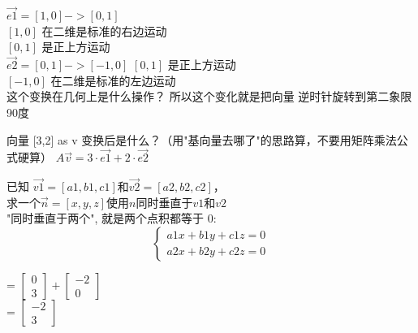 \documentclass[12pt]{article}
\begin{document}
\begin{flushleft}





$\vec{e1} = [1, 0] -> [0, 1]$ \\
$[1,0]$ 在二维是标准的右边运动 \\
$[0,1]$ 是正上方运动 \\

$\vec{e2} = [0, 1] -> [-1, 0] $
$[0,1]$ 是正上方运动 \\
$[-1,0]$ 在二维是标准的左边运动 \\

这个变换在几何上是什么操作？
所以这个变化就是把向量 逆时针旋转到第二象限 90度

向量
[3,2] as v 变换后是什么？（用"基向量去哪了"的思路算，不要用矩阵乘法公式硬算）
$A\vec{v} = 
3 \cdot \vec{e1} +  2 \cdot \vec{e2}$ \\
\begin{flushleft}
    已知 $\vec{v1} = [a1, b1, c1] 和 \vec{v2} = [a2, b2, c2]$，\\
    求一个$\vec{n} = [x, y, z] 使用n 同时垂直于v1和v2$ \\
    
    "同时垂直于两个", 就是两个点积都等于 0: \\ 
    $$
    \left\{ 
    \begin{aligned}
        a1x + b1y + c1z = 0 \\ 
        a2x + b2y + c2z = 0
    \end{aligned} 
    \right.$$

\end{flushleft}

= $ \begin{bmatrix}
    0 \\
    3
\end{bmatrix} + \begin{bmatrix}
    -2\\ 
     0
\end{bmatrix}$ \\
= $\begin{bmatrix}
    -2\\
    3
\end{bmatrix}$
\end{flushleft}
\end{document}
